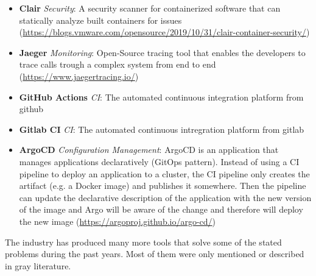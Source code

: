 \begin{itemize}
    \item \textbf{Clair} \textit{Security}:
    A security scanner for containerized software that can statically analyze
    built containers for issues
    (\url{https://blogs.vmware.com/opensource/2019/10/31/clair-container-security/})
    \item \textbf{Jaeger} \textit{Monitoring}:
    Open-Source tracing tool that enables the developers to trace calls
    trough a complex system from end to end
    (\url{https://www.jaegertracing.io/})
    \item \textbf{GitHub Actions} \textit{CI}: The automated continuous integration
    platform from github
    \item \textbf{Gitlab CI} \textit{CI}: The automated continuous intregration
    platform from gitlab
    \item \textbf{ArgoCD} \textit{Configuration Management}: ArgoCD is an
    application that manages applications declaratively (GitOps pattern).
    Instead of using a CI pipeline to deploy an application to a cluster,
    the CI pipeline only creates the artifact (e.g. a Docker image) and publishes
    it somewhere. Then the pipeline can update the declarative description
    of the application with the new version of the image and Argo will
    be aware of the change and therefore will deploy the new image
    (\url{https://argoproj.github.io/argo-cd/})
\end{itemize}

The industry has produced many more tools that solve some of the stated
problems during the past years. Most of them were only mentioned or described
in gray literature.
